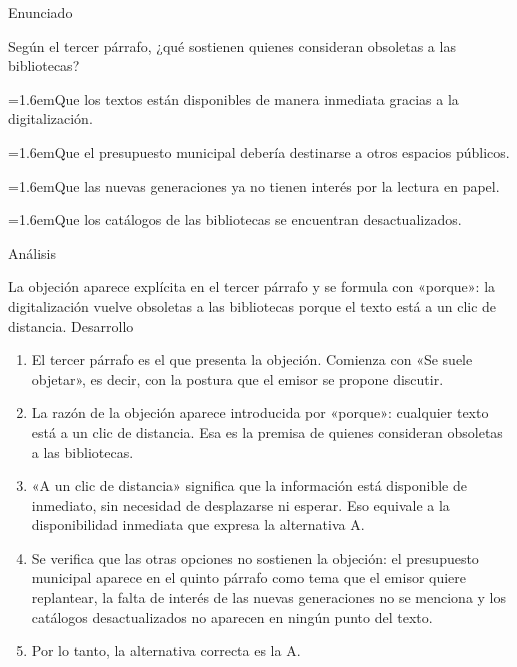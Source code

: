 \documentclass[10pt,a4paper,twocolumn]{article}
\newcommand{\alternativa}[2]{\par\noindent\hangindent=1.6em\hangafter=1\makebox[1.6em][l]{\tecla{#1}}#2\par}
\newcommand{\clave}[1]{\par\smallskip{\sffamily\footnotesize\color{esmeralda} Clave \teclaok{#1}}\par}
\begin{document}
\begin{ejemplo}
{\sffamily\footnotesize\color{zinc500} Enunciado}\par
Según el tercer párrafo, ¿qué sostienen quienes consideran obsoletas a las bibliotecas?
\alternativa{A}{Que los textos están disponibles de manera inmediata gracias a la digitalización.}
\alternativa{B}{Que el presupuesto municipal debería destinarse a otros espacios públicos.}
\alternativa{C}{Que las nuevas generaciones ya no tienen interés por la lectura en papel.}
\alternativa{D}{Que los catálogos de las bibliotecas se encuentran desactualizados.}
\clave{A}
{\sffamily\footnotesize\color{zinc500} Análisis}\par La objeción aparece explícita en el tercer párrafo y se formula con «porque»: la digitalización vuelve obsoletas a las bibliotecas porque el texto está a un clic de distancia.
{\sffamily\footnotesize\color{zinc500} Desarrollo}
\begin{enumerate}
  \item El tercer párrafo es el que presenta la objeción. Comienza con «Se suele objetar», es decir, con la postura que el emisor se propone discutir.
  \item La razón de la objeción aparece introducida por «porque»: cualquier texto está a un clic de distancia. Esa es la premisa de quienes consideran obsoletas a las bibliotecas.
  \item «A un clic de distancia» significa que la información está disponible de inmediato, sin necesidad de desplazarse ni esperar. Eso equivale a la disponibilidad inmediata que expresa la alternativa A.
  \item Se verifica que las otras opciones no sostienen la objeción: el presupuesto municipal aparece en el quinto párrafo como tema que el emisor quiere replantear, la falta de interés de las nuevas generaciones no se menciona y los catálogos desactualizados no aparecen en ningún punto del texto.
  \item Por lo tanto, la alternativa correcta es la A.
\end{enumerate}
\end{ejemplo}
\end{document}
